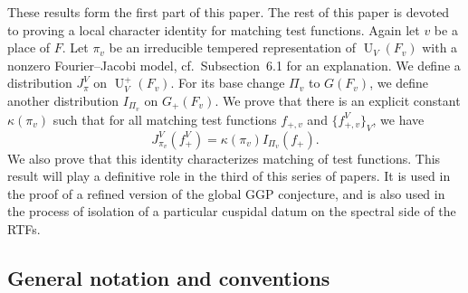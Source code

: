 \documentclass[letterpaper,11pt]{amsart}
\newcommand{\<}{\negthickspace}
\DeclareMathOperator{\U}{U}
\theoremstyle{definition}
\theoremstyle{plain}
\theoremstyle{remark}
\numberwithin{equation}{section}
\begin{document}
These results form the first part of this paper. The rest of this paper is devoted to proving a local character identity for matching test functions. Again let $v$ be a place of $F$. Let $\pi_v$ be an irreducible tempered representation of $\U_V(F_v)$ with a nonzero Fourier--Jacobi model, cf.~Subsection~6.1 for an explanation. We define a distribution $J_{\pi}^V$ on $\U_V^+(F_v)$. For its base change $\Pi_v$ to $G(F_v)$, we define another distribution $I_{\Pi_v}$ on $G_+(F_v)$. We prove that there is an explicit constant $\kappa(\pi_v)$ such that for all matching test functions $f_{+, v}$ and $\{f_{+, v}^V\}_V$, we have
    \[
    J_{\pi_v}^V(f^V_+) = \kappa(\pi_v) I_{\Pi_v}(f_+).
    \]
We also prove that this identity characterizes matching of test functions. This result will play a definitive role in the third of this series of papers. It is used in the proof of a refined version of the global GGP conjecture, and is also used in the process of isolation of a particular cuspidal datum on the spectral side of the RTFs.


\subsection{General notation and conventions}
\end{document}
